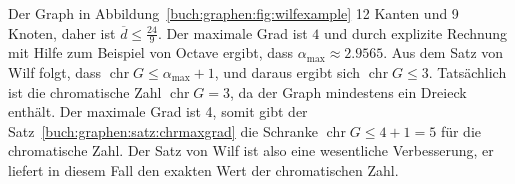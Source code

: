 \begin{beispiel}
Der Graph in Abbildung~\ref{buch:graphen:fig:wilfexample} 12 Kanten und 9
Knoten, daher ist $\overline{d}\le \frac{24}{9}$.
Der maximale Grad ist $4$ und durch explizite Rechnung mit Hilfe zum Beispiel
von Octave ergibt, dass $\alpha_{\text{max}}\approx 2.9565$.
Aus dem Satz von Wilf folgt, dass
$\operatorname{chr}G\le \alpha_{\text{max}}+1$, und daraus ergibt sich
$\operatorname{chr}G\le 3$.
Tatsächlich ist die chromatische Zahl $\operatorname{chr}G=3$, da 
der Graph mindestens ein Dreieck enthält.
Der maximale Grad ist 4, somit gibt der
Satz~\ref{buch:graphen:satz:chrmaxgrad}
die Schranke 
$\operatorname{chr}G\le 4+1=5$
für die chromatische Zahl.
Der Satz von Wilf ist also eine wesentliche Verbesserung, er liefert in
diesem Fall den exakten Wert der chromatischen Zahl.
\end{beispiel}



